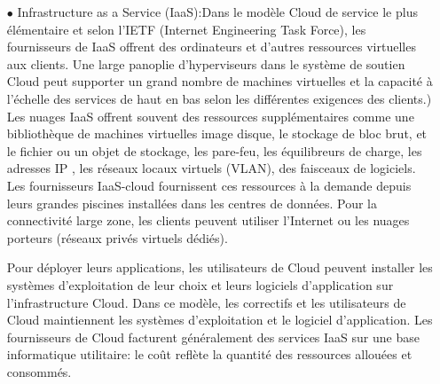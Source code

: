         \begin{itemize}
            \item[\quad $\bullet$] Infrastructure as a Service (IaaS):Dans le modèle Cloud de service le plus élémentaire et selon l'IETF (Internet Engineering Task Force), les fournisseurs de IaaS offrent des ordinateurs et d'autres ressources virtuelles aux clients. Une large panoplie  d’hyperviseurs dans le système de soutien Cloud peut supporter un grand nombre de machines virtuelles et la capacité à l'échelle des services de haut en bas selon les différentes exigences des clients.) Les nuages IaaS offrent souvent des ressources supplémentaires comme une bibliothèque de machines virtuelles image disque, le stockage de bloc brut, et le fichier ou un objet de stockage, les pare-feu, les équilibreurs de charge, les adresses IP , les réseaux locaux virtuels (VLAN), des faisceaux de logiciels. Les fournisseurs IaaS-cloud fournissent ces ressources à la demande depuis leurs grandes piscines installées dans les centres de données. Pour la connectivité large zone, les clients peuvent utiliser l'Internet ou les nuages porteurs (réseaux privés virtuels dédiés).

                Pour déployer leurs applications, les utilisateurs de Cloud peuvent installer les systèmes d'exploitation de leur choix et leurs logiciels d'application sur l'infrastructure Cloud. Dans ce modèle, les correctifs et les utilisateurs de Cloud maintiennent les systèmes d'exploitation et le logiciel d'application. Les fournisseurs de Cloud facturent généralement des services IaaS sur une base informatique utilitaire: le coût reflète la quantité des ressources allouées et consommés.




\end{itemize}
